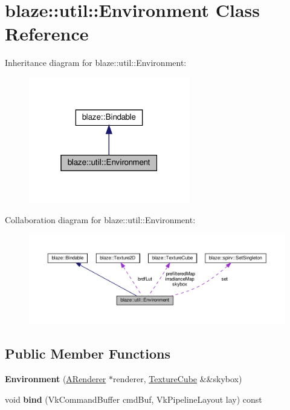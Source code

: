 \hypertarget{classblaze_1_1util_1_1Environment}{}\section{blaze\+:\+:util\+:\+:Environment Class Reference}
\label{classblaze_1_1util_1_1Environment}


Inheritance diagram for blaze\+:\+:util\+:\+:Environment\+:\nopagebreak
\begin{figure}[H]
\begin{center}
\leavevmode
\includegraphics[width=199pt]{classblaze_1_1util_1_1Environment__inherit__graph}
\end{center}
\end{figure}


Collaboration diagram for blaze\+:\+:util\+:\+:Environment\+:\nopagebreak
\begin{figure}[H]
\begin{center}
\leavevmode
\includegraphics[width=350pt]{classblaze_1_1util_1_1Environment__coll__graph}
\end{center}
\end{figure}
\subsection*{Public Member Functions}
\begin{DoxyCompactItemize}
\item 
\mbox{\label{classblaze_1_1util_1_1Environment_aa4f99d469e378ea8ab9d7fb3af343e11}} 
{\bfseries Environment} (\hyperlink{classblaze_1_1ARenderer}{A\+Renderer} $\ast$renderer, \hyperlink{classblaze_1_1TextureCube}{Texture\+Cube} \&\&skybox)
\item 
\mbox{\label{classblaze_1_1util_1_1Environment_a9a7be13c2be2c08d3b9a04d88ef1c3bd}} 
void {\bfseries bind} (Vk\+Command\+Buffer cmd\+Buf, Vk\+Pipeline\+Layout lay) const
\end{DoxyCompactItemize}
